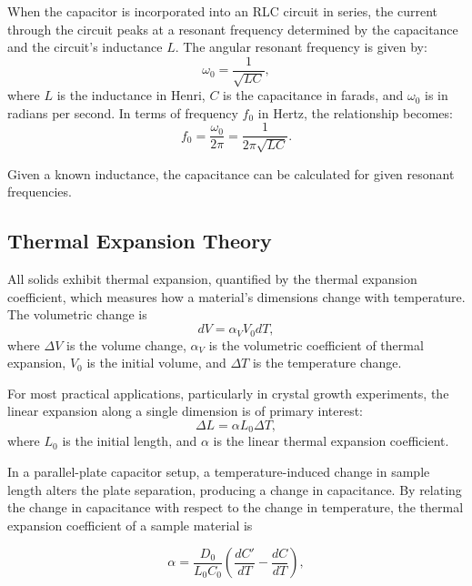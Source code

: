 \documentclass[letterpaper,12pt]{article}
\begin{document}
When the capacitor is incorporated into an RLC circuit in series, the current through the circuit peaks at a resonant frequency determined by the capacitance and the circuit's inductance \(L\). The angular resonant frequency is given by:  
\begin{equation}
    \omega_0 = \frac{1}{\sqrt{LC}},
    \label{eq2}
\end{equation}  
where \(L\) is the inductance in Henri, \(C\) is the capacitance in farads, and \(\omega_0\) is in radians per second. In terms of frequency \(f_0\) in Hertz, the relationship becomes:  
\begin{equation}
    f_0 = \frac{\omega_0}{2\pi} = \frac{1}{2\pi \sqrt{LC}}.
\end{equation}  

Given a known inductance, the capacitance can be calculated for given resonant frequencies.

\subsection{Thermal Expansion Theory}  

All solids exhibit thermal expansion, quantified by the thermal expansion coefficient, which measures how a material’s dimensions change with temperature. The volumetric change is
\begin{equation}
    d V = \alpha_V V_0 d T,
\end{equation}
where \(\Delta V\) is the volume change, \(\alpha_V\) is the volumetric coefficient of thermal expansion, \(V_0\) is the initial volume, and \(\Delta T\) is the temperature change.  

For most practical applications, particularly in crystal growth experiments, the linear expansion along a single dimension is of primary interest:  
\begin{equation}
    \Delta L = \alpha L_0 \Delta T,
    \label{eq5}
\end{equation}
where \(L_0\) is the initial length, and \(\alpha\) is the linear thermal expansion coefficient. 

In a parallel-plate capacitor setup, a temperature-induced change in sample length alters the plate separation, producing a change in capacitance. By relating the change in capacitance with respect to the change in temperature, the thermal expansion coefficient of a sample material is


\begin{equation}
    \alpha =\frac{D_0}{L_0C_0}\left (\frac{dC'}{dT}-\frac{dC}{dT}\right),
    \label{eq7}
\end{equation}
\end{document}
